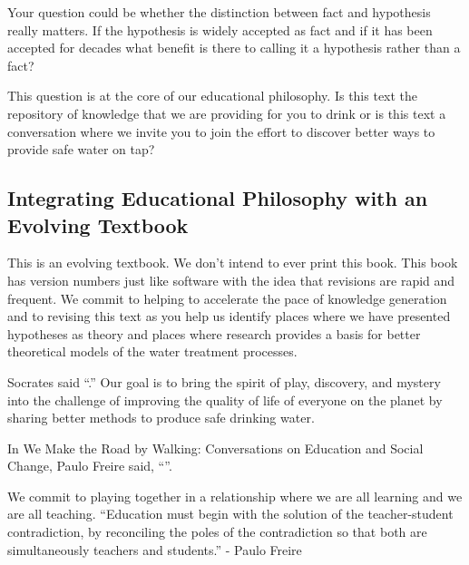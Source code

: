 \documentclass[letterpaper,10pt,english]{sphinxmanual}
\begin{document}
Your question could be whether the distinction between fact and hypothesis really matters. If the hypothesis is widely accepted as fact and if it has been accepted for decades what benefit is there to calling it a hypothesis rather than a fact?

This question is at the core of our educational philosophy. Is this text the repository of knowledge that we are providing for you to drink or is this text a conversation where we invite you to join the effort to discover better ways to provide safe water on tap?


\subsection{Integrating Educational Philosophy with an Evolving Textbook}
\label{\detokenize{Introduction/Introduction:integrating-educational-philosophy-with-an-evolving-textbook}}\label{\detokenize{Introduction/Introduction:heading-textbook-philosophy}}
This is an evolving textbook. We don’t intend to ever print this book. This book has version numbers just like software with the idea that revisions are rapid and frequent. We commit to helping to accelerate the pace of knowledge generation and to revising this text as you help us identify places where we have presented hypotheses as theory and places where research provides a basis for better theoretical models of the water treatment processes.

Socrates said “.” Our goal is to bring the spirit of play, discovery, and mystery into the challenge of improving the quality of life of everyone on the planet by sharing better methods to produce safe drinking water.

In We Make the Road by Walking: Conversations on Education and Social Change, Paulo Freire said,
“”.

We commit to playing together in a relationship where we are all learning and we are all teaching.
“Education must begin with the solution of the teacher-student contradiction, by reconciling the poles of the contradiction so that both are simultaneously teachers and students.” - Paulo Freire
\end{document}
